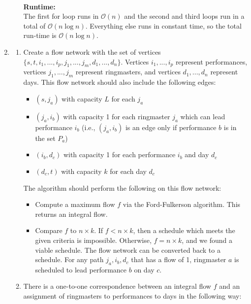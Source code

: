 \documentclass{article}
\begin{document}
\begin{enumerate}
\begin{enumerate}
\begin{figure}[H]
\end{figure}
  \\
  \textbf{Runtime:}\\ The first for loop runs in $\mathcal{O}(n)$ and the second and third loops run in a total of $\mathcal{O}(n\log n)$. Everything else runs in constant time, so the total run-time is $\mathcal{O}(n\log n)$.
    \end{enumerate}
    \newpage
    \item %
    \begin{enumerate}
        \item Create a flow network with the set of vertices $\{s, t, i_1, ..., i_p, j_1, ..., j_m, d_1, ..., d_n\}$. Vertices $i_1, ..., i_p$ represent performances, vertices $j_1, ..., j_m$ represent ringmasters, and vertices $d_1, ..., d_n$ represent days. This flow network should also include the following edges:
        \begin{itemize}
            \item $(s, j_a)$ with capacity $L$ for each $j_a$
            \item $(j_a, i_b)$ with capacity 1 for each ringmaster $j_a$ which can lead performance $i_b$ (i.e., $(j_a, i_b)$ is an edge only if performance $b$ is in the set $P_a$)
            \item $(i_b, d_c)$ with capacity 1 for each performance $i_b$ and day $d_c$
            \item $(d_c, t)$ with capacity $k$ for each day $d_c$
        \end{itemize}
        The algorithm should perform the following on this flow network:
        \begin{itemize}
            \item Compute a maximum flow $f$ via the Ford-Fulkerson algorithm. This returns an integral flow.
            \item Compare $f$ to $n \times k$. If $f < n \times k$, then a schedule which meets the given criteria is impossible. Otherwise, $f = n \times k$, and we found a viable schedule. The flow network can be converted back to a schedule. For any path $j_a, i_b, d_c$ that has a flow of 1, ringmaster $a$ is scheduled to lead performance $b$ on day $c$.
        \end{itemize}
        \item There is a one-to-one correspondence between an integral flow $f$ and an assignment of ringmasters to performances to days in the following way:
        \begin{itemize}

\end{itemize}
\end{enumerate}
\end{enumerate}
\end{document}
